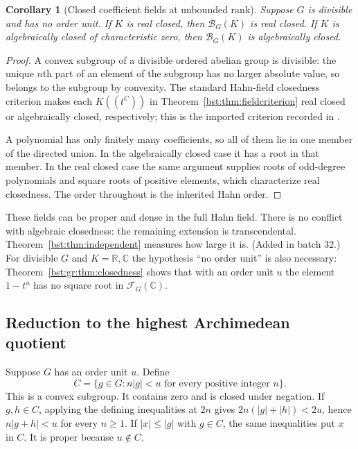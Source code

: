 \documentclass[11pt,letterpaper]{article}
\newtheorem{corollary}[theorem]{Corollary}
\theoremstyle{definition}
\theoremstyle{remark}
\newcommand{\R}{\mathbb R}
\newcommand{\C}{\mathbb C}
\newcommand{\HH}[2]{#1((t^{#2}))}
\newcommand{\BB}[2]{\mathcal B_{#2}(#1)}
\newcommand{\FF}[2]{\mathcal F_{#2}(#1)}
\newcommand{\abs}[1]{\lvert #1\rvert}
\begin{document}
\begin{corollary}[Closed coefficient fields at unbounded rank]\label{bst:cor:closedbase}
Suppose $G$ is divisible and has no order unit. If $K$ is real closed, then
$\BB KG$ is real closed. If $K$ is algebraically closed of characteristic
zero, then $\BB KG$ is algebraically closed.
\end{corollary}
\begin{proof}
A convex subgroup of a divisible ordered abelian group is divisible: the
unique $n$th part of an element of the subgroup has no larger absolute
value, so belongs to the subgroup by convexity. The standard Hahn-field
closedness criterion makes each $\HH KC$ in Theorem~\ref{bst:thm:fieldcriterion}
real closed or algebraically closed, respectively; this is the imported
criterion recorded in \cite[Fact~2.1.1]{LM24}.

A polynomial has only finitely many coefficients, so all of them lie in
one member of the directed union. In the algebraically closed case it has
a root in that member. In the real closed case the same argument supplies
roots of odd-degree polynomials and square roots of positive elements,
which characterize real closedness. The order throughout is the inherited
Hahn order.
\end{proof}

These fields can be proper and dense in the full Hahn field. There is no
conflict with algebraic closedness: the remaining extension is
transcendental. Theorem~\ref{bst:thm:independent} measures how large it is.
(Added in batch 32.) For divisible $G$ and $K=\R,\C$ the hypothesis ``no
order unit'' is also necessary: Theorem~\ref{bst:gr:thm:closedness} shows that
with an order unit $u$ the element $1-t^u$ has no square root in $\FF{\C}G$.

\subsection{Reduction to the highest Archimedean quotient}

Suppose $G$ has an order unit $u$. Define
\begin{equation}\label{bst:eq:topconvex}
 C=\{g\in G:n\abs g<u\text{ for every positive integer }n\}.
\end{equation}
This is a convex subgroup. It contains zero and is closed under negation.
If $g,h\in C$, applying the defining inequalities at $2n$ gives
$2n(|g|+|h|)<2u$, hence $n|g+h|<u$ for every $n\ge1$.
If $|x|\le|g|$ with $g\in C$, the same inequalities put $x$ in $C$.
It is proper because $u\notin C$.
\end{document}
